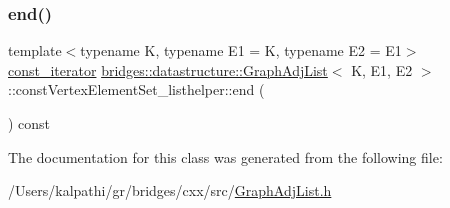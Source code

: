 \mbox{\label{classbridges_1_1datastructure_1_1_graph_adj_list_1_1const_vertex_element_set__listhelper_a836477771db915bc417ab9f2811ac7c2}} 
\subsubsection{\texorpdfstring{end()}{end()}}
{\footnotesize\ttfamily template$<$typename K, typename E1 = K, typename E2 = E1$>$ \\
\mbox{\hyperlink{classbridges_1_1datastructure_1_1_graph_adj_list_1_1const_vertex_element_set__listhelper_1_1const__iterator}{const\+\_\+iterator}} \mbox{\hyperlink{classbridges_1_1datastructure_1_1_graph_adj_list}{bridges\+::datastructure\+::\+Graph\+Adj\+List}}$<$ K, E1, E2 $>$\+::const\+Vertex\+Element\+Set\+\_\+listhelper\+::end (\begin{DoxyParamCaption}{ }\end{DoxyParamCaption}) const\hspace{0.3cm}{\ttfamily [inline]}}



The documentation for this class was generated from the following file\+:\begin{DoxyCompactItemize}
\item 
/\+Users/kalpathi/gr/bridges/cxx/src/\mbox{\hyperlink{_graph_adj_list_8h}{Graph\+Adj\+List.\+h}}\end{DoxyCompactItemize}
